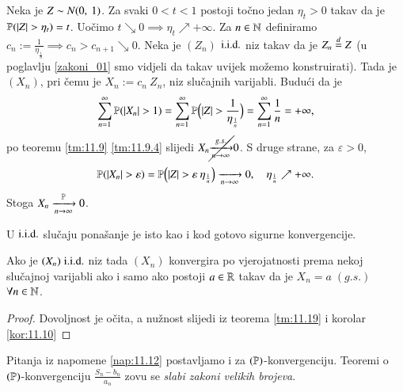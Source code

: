 \begin{pr}  \label{pr:11.23}
    Neka je $Z \sim N ({0}, \: {1})$. Za svaki $0<t<1$ postoji to\v cno jedan $\eta_t > 0$ takav da je $\mathbb{P}({|Z| > \eta_t}) = t$.
    Uo\v cimo $t \searrow 0 \implies \eta_t \nearrow +\infty$.
    Za $n \in \mathbb{N}$ definiramo $c_n := \frac{1}{\eta_\frac{1}{n}}\implies c_n > c_{n + 1} \searrow 0$.
    Neka je $(Z_n)$ $\mathrm{i.i.d.}$ niz takav da je $Z_n \overset{d}{=} Z$ (u poglavlju \ref{zakoni_01} smo vidjeli da takav uvijek mo\v zemo konstruirati).
    Tada je $(X_n)$, pri \v cemu je $X_n := c_n \: Z_n$, niz slu\v cajnih varijabli.
    Budu\' ci da je
    \begin{equation*}
        \sum\limits_{n = 1}^{\infty} \mathbb{P}({|X_n| > 1}) = \sum\limits_{n = 1}^{\infty} \mathbb{P} \Big( |Z| > \frac{1}{\eta_\frac{1}{n}} \Big) = \sum\limits_{n = 1}^{\infty} \frac{1}{n} = +\infty,
    \end{equation*}
    po teoremu \ref{tm:11.9} \ref{tm:11.9.4} slijedi $X_n \cancel{\xrightarrow[n \to \infty]{g.s.}} 0$.
    S druge strane, za $\varepsilon > 0$,
    \begin{equation*}
        \mathbb{P}({|X_n| > \varepsilon}) = \mathbb{P} \Big( |Z| > \varepsilon \: \eta_\frac{1}{n} \Big) \xrightarrow[n \to \infty]{} 0, \quad \eta_\frac{1}{n} \nearrow +\infty.
    \end{equation*}
    Stoga $X_n \xrightarrow[n \to \infty]{\mathbb{P}} 0$.
\end{pr}

U $\mathrm{i.i.d.}$ slu\v caju pona\v sanje je isto kao i kod gotovo sigurne konvergencije.

\begin{kor} \label{kor:11.24}
    Ako je $(X_n) \; \mathrm{i.i.d.}$ niz tada $(X_n)$ konvergira po vjerojatnosti prema nekoj slu\v cajnoj varijabli ako i samo ako postoji $a \in \mathbb{R}$ takav da je $X_n = a \; (g.s.)$ $\forall n \in \mathbb{N}$.
\end{kor}

\begin{proof}
    Dovoljnost je o\v cita, a nu\v znost slijedi iz teorema \ref{tm:11.19} i korolar \ref{kor:11.10}
\end{proof}

Pitanja iz napomene \ref{nap:11.12} postavljamo i za $(\mathbb{P})$-konvergenciju.
Teoremi o $(\mathbb{P})$-konvergenciju $\frac{S_n - b_n}{a_n}$ zovu se \emph{slabi zakoni velikih brojeva}.